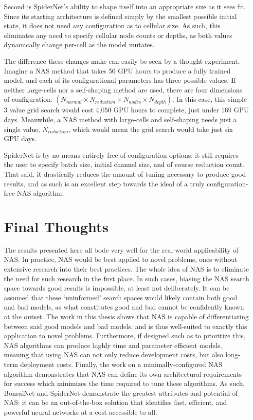 Second is SpiderNet's ability to shape itself into an appropriate size as it sees fit. Since its starting architecture is
defined simply by the smallest possible initial state, it does not need any configuration as to cellular size. As such,
this eliminates any need to specify cellular node counts or depths, as both values dynamically change per-cell as
the model mutates.

The difference these changes make can easily be seen by a thought-experiment. Imagine a NAS method that
takes 50 GPU hours to produce a fully trained model, and each of its configurational
parameters has three possible values. If neither large-cells nor a self-shaping method are used, there are
four dimensions of configuration: $\left(N_{normal}
\times N_{reduction} \times N_{nodes} \times {N_{depth}}\right)$. In this case, this simple 3 value grid search would cost
4,050 GPU hours to complete, just under 169 GPU days. Meanwhile, a NAS method with large-cells and self-shaping needs just
a single value, $N_{reduction}$, which would mean the grid search would take just six GPU days.

SpiderNet is by no means entirely free of configuration options; it still requires the user to specify batch size,
initial channel size, and of course reduction count. That said, it drastically reduces the amount of tuning necessary to
produce good results, and as such is an excellent step towards the ideal of a truly configuration-free NAS algorithm.
\vspace{-1em}
\section{Final Thoughts}
The results presented here all bode very well for the real-world applicability of NAS. In practice, NAS would be best applied to novel problems,
ones without extensive research into their best practices. The whole idea of NAS is to eliminate the need for such
research in the first place. In such cases, biasing the NAS search space towards good results is impossible, at least
not deliberately. It can be assumed that these `uninformed' search spaces would likely contain both good and bad models,
as what constitutes good and bad cannot be confidently known at the outset. The work in this thesis shows that NAS is
capable of differentiating between said good models and bad models, and is thus well-suited to exactly this application
to novel problems. Furthermore, if designed such as to prioritize this, NAS algorithms can produce highly time and
parameter efficient models, meaning that using NAS can not only reduce development costs,
but also long-term deployment costs. Finally, the work on a minimally-configured NAS algorithm demonstrates that
NAS can define its own architectural requirements for success which minimizes the time required to tune these algorithms.
As such, BonsaiNet and SpiderNet demonstrate the greatest attributes and potential of NAS: it can be an out-of-the-box
solution that identifies fast, efficient, and powerful neural networks at a cost accessible to all.